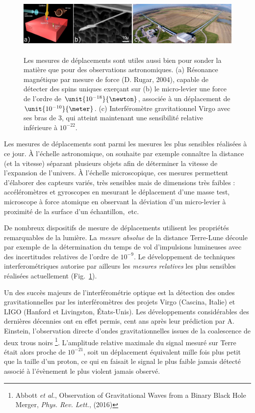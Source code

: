 \documentclass[12pt,a4paper]{article}
\begin{document}
\begin{figure}[b]
\center
\includegraphics[height=90pt]{figures/displacement_small.png}
\caption{Les mesures de déplacements sont utiles aussi bien pour sonder la matière que pour des observations astronomiques.
(a) Résonance magnétique par mesure de force (D. Rugar, 2004), capable de détecter des spins uniques exerçant sur (b) le micro-levier une force de l'ordre de $\unit{10^{-18}}{\newton}$, associée à un déplacement de $\unit{10^{-10}}{\meter}$.
(c) Interféromètre gravitationnel Virgo avec ses bras de \unit{3}{\kilo\meter}, qui atteint maintenant une sensibilité relative inférieure à $10^{-22}$.}
\label{fig:displacement_measurement}
\end{figure}

Les mesures de déplacements sont parmi les mesures les plus sensibles réalisées à ce jour.
À l'échelle astronomique, on souhaite par exemple connaître la distance (et la vitesse) séparant plusieurs objets afin de déterminer la vitesse de l'expansion de l'univers.
À l'échelle microscopique, ces mesures permettent d'élaborer des capteurs variés, très sensibles mais de dimensions très faibles : accéléromètres et gyroscopes en mesurant le déplacement d'une masse test, microscope à force atomique en observant la déviation d'un micro-levier à proximité de la surface d'un échantillon,~etc.
 
De nombreux dispositifs de mesure de déplacements utilisent les propriétés remarquables de la lumière.
La \textit{mesure absolue} de la distance Terre-Lune découle par exemple de la détermination du temps de vol d'impulsions lumineuses avec des incertitudes relatives de l'ordre de $10^{-9}$.
Le développement de techniques interferométriques autorise par ailleurs les \textit{mesures relatives} les plus sensibles réalisées actuellement (Fig.~\ref{fig:displacement_measurement}).

Un des succès majeurs de l'interférométrie optique est la détection des ondes gravitationnelles par les interféromètres des projets Virgo (Cascina, Italie) et LIGO (Hanford et Livingston, États-Unis).
Les développements considérables des dernières décennies ont en effet permis, cent ans après leur prédiction par A. Einstein, l'observation directe d'ondes gravitationnelles issues de la coalescence de deux trous noirs
\footnote{Abbott \textit{et al.}, Observation of Gravitational Waves from a Binary Black Hole Merger, \textit{Phys. Rev. Lett.}, (2016)}.
L'amplitude relative maximale du signal mesuré sur Terre était alors proche de $10^{-21}$, soit un déplacement équivalent mille fois plus petit que la taille d'un proton, ce qui en faisait le signal le plus faible jamais détecté associé à l'évènement le plus violent jamais observé.
\end{document}
